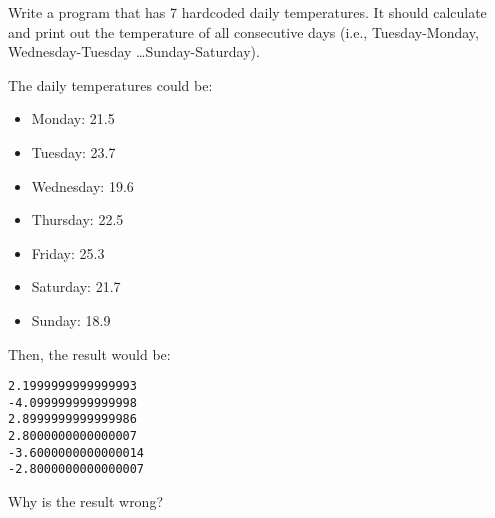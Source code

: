 Write a program that has 7 hardcoded daily temperatures. It should calculate and print out the temperature of all consecutive days (i.e., Tuesday-Monday, Wednesday-Tuesday \ldots Sunday-Saturday).

The daily temperatures could be:

\begin{itemize}
  \item Monday: 21.5
  \item Tuesday: 23.7
  \item Wednesday: 19.6
  \item Thursday: 22.5
  \item Friday: 25.3
  \item Saturday: 21.7
  \item Sunday: 18.9
\end{itemize}

Then, the result would be:
\begin{verbatim}
2.1999999999999993
-4.099999999999998
2.8999999999999986
2.8000000000000007
-3.6000000000000014
-2.8000000000000007
\end{verbatim}

Why is the result wrong?

